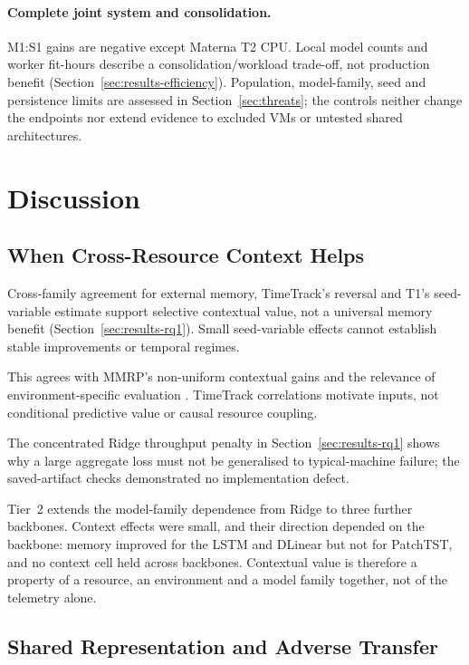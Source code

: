 \documentclass[5p,twocolumn]{elsarticle}
\begin{document}
\paragraph{Complete joint system and consolidation.}
M1:S1 gains are negative except Materna T2 CPU. Local model counts and worker
fit-hours describe a consolidation/workload trade-off, not production benefit
(Section~\ref{sec:results-efficiency}). Population, model-family, seed and
persistence limits are assessed in Section~\ref{sec:threats}; the controls
neither change the endpoints nor extend evidence to excluded VMs or untested
shared architectures.

\section{Discussion}
\label{sec:discussion}

\subsection{When Cross-Resource Context Helps}
\label{sec:discussion-context}

Cross-family agreement for external memory, TimeTrack's reversal and T1's
seed-variable estimate support selective contextual value, not a universal
memory benefit (Section~\ref{sec:results-rq1}). Small seed-variable effects
cannot establish stable improvements or temporal regimes.

This agrees with MMRP's non-uniform contextual gains \citep{Tripathi2025MMRP}
and the relevance of environment-specific evaluation
\citep{Rossi2025CloudUncertainty}. TimeTrack correlations
\citep{Meliani2025TimeTrack} motivate inputs, not conditional predictive value
or causal resource coupling.

The concentrated Ridge throughput penalty in Section~\ref{sec:results-rq1}
shows why a large aggregate loss must not be generalised to typical-machine
failure; the saved-artifact checks demonstrated no implementation defect.

Tier~2 extends the model-family dependence from Ridge to three further
backbones. Context effects were small, and their direction depended on the
backbone: memory improved for the LSTM and DLinear but not for PatchTST, and
no context cell held across backbones. Contextual value is therefore a
property of a resource, an environment and a model family together, not of
the telemetry alone.

\subsection{Shared Representation and Adverse Transfer}
\label{sec:discussion-sharing}
\end{document}
